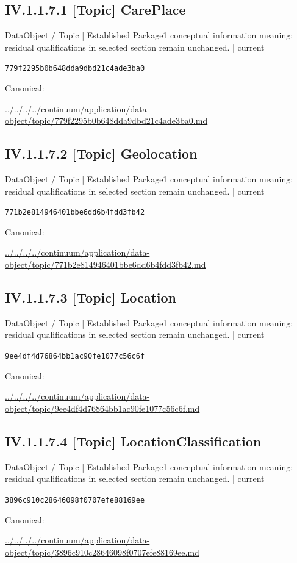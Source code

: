 \documentclass[10pt,a4paper]{article}
\begin{document}
\subsection*{IV.1.1.7.1 [Topic] CarePlace}
{\small DataObject / Topic | Established Package1 conceptual information meaning; residual qualifications in selected section remain unchanged. | current}\par
\texttt{779f2295b0b648dda9dbd21c4ade3ba0}\par
Canonical: \par
{\footnotesize\url{../../../../continuum/application/data-object/topic/779f2295b0b648dda9dbd21c4ade3ba0.md}}\par
\subsection*{IV.1.1.7.2 [Topic] Geolocation}
{\small DataObject / Topic | Established Package1 conceptual information meaning; residual qualifications in selected section remain unchanged. | current}\par
\texttt{771b2e814946401bbe6dd6b4fdd3fb42}\par
Canonical: \par
{\footnotesize\url{../../../../continuum/application/data-object/topic/771b2e814946401bbe6dd6b4fdd3fb42.md}}\par
\subsection*{IV.1.1.7.3 [Topic] Location}
{\small DataObject / Topic | Established Package1 conceptual information meaning; residual qualifications in selected section remain unchanged. | current}\par
\texttt{9ee4df4d76864bb1ac90fe1077c56c6f}\par
Canonical: \par
{\footnotesize\url{../../../../continuum/application/data-object/topic/9ee4df4d76864bb1ac90fe1077c56c6f.md}}\par
\subsection*{IV.1.1.7.4 [Topic] LocationClassification}
{\small DataObject / Topic | Established Package1 conceptual information meaning; residual qualifications in selected section remain unchanged. | current}\par
\texttt{3896c910c28646098f0707efe88169ee}\par
Canonical: \par
{\footnotesize\url{../../../../continuum/application/data-object/topic/3896c910c28646098f0707efe88169ee.md}}\par
\end{document}
